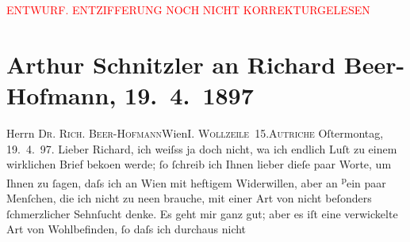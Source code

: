 
\begin{center}
            \textcolor{red}{ENTWURF. ENTZIFFERUNG NOCH NICHT KORREKTURGELESEN}
                      \end{center}
            
               \section[Arthur Schnitzler an Richard Beer-Hofmann, 19. 4. 1897]{ Arthur Schnitzler an Richard Beer-Hofmann, 19. 4. 1897}\nopagebreak{}\rehead{ }\begin{ledgroupsized}[t]{13cm}\normalsize\beginnumbering{} \toendnotes[C]{\smallbreak\pagebreak[2]} 
\toendnotes[C]{\smallbreak}\pstart{}{\pb}Herrn \textsc{Dr. Rich.
                     Beer-Hofmann}\pend{}\pstart{}Wien\pend{}\pstart{}\textsc{I. Wollzeile 15}.\pend{}\pstart{}\textsc{Autriche}\pend{}{\bigskip}\pstart
           \raggedleft{}{\pb}Oſtermontag, 19. 4. 97.\pend
           \pstart
           Lieber Richard, ich weiſss ja doch nicht, wa{\geminationn} ich endlich Luſt zu einem wirklichen Brief beko{\geminationm}en werde; ſo ſchreib ich Ihnen lieber dieſe paar Worte,
               um Ihnen zu ſagen, daſs ich an Wien mit heftigem
               Widerwillen, aber an \substVorne{}\textsuperscript{p}\substDazwischen{}e\substHinten{}in paar Menſchen, die ich nicht zu ne{\geminationn}en
               brauche, mit einer Art \introOben{}von\introOben{} nicht beſonders {\pb}ſchmerzlicher Sehnſucht denke. Es geht mir ganz gut;
               aber es iſt eine verwickelte Art von Wohlbefinden, ſo daſs ich durchaus nicht

\end{ledgroupsized}
